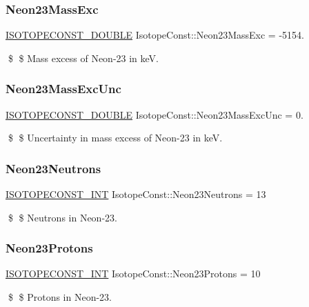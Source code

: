 \subsubsection{\texorpdfstring{Neon23\+Mass\+Exc}{Neon23MassExc}}
{\footnotesize\ttfamily \mbox{\hyperlink{group___isotope_const-_macros_ga8f45a7272ce02c0b4c65c44636ed719a}{I\+S\+O\+T\+O\+P\+E\+C\+O\+N\+S\+T\+\_\+\+D\+O\+U\+B\+LE}} Isotope\+Const\+::\+Neon23\+Mass\+Exc = -\/5154.}

\$ \$ Mass excess of Neon-\/23 in keV. \mbox{\label{group___isotope_const-_neon-_ne23_ga266e22a6d297330d9c5ab2d5cd67c79d}} 
\subsubsection{\texorpdfstring{Neon23\+Mass\+Exc\+Unc}{Neon23MassExcUnc}}
{\footnotesize\ttfamily \mbox{\hyperlink{group___isotope_const-_macros_ga8f45a7272ce02c0b4c65c44636ed719a}{I\+S\+O\+T\+O\+P\+E\+C\+O\+N\+S\+T\+\_\+\+D\+O\+U\+B\+LE}} Isotope\+Const\+::\+Neon23\+Mass\+Exc\+Unc = 0.}

\$ \$ Uncertainty in mass excess of Neon-\/23 in keV. \mbox{\label{group___isotope_const-_neon-_ne23_gad3a426a30ee41c4b3f859c8c8966a3b5}} 
\subsubsection{\texorpdfstring{Neon23\+Neutrons}{Neon23Neutrons}}
{\footnotesize\ttfamily \mbox{\hyperlink{group___isotope_const-_macros_ga5f18360b3e99483a35c32d789e62621c}{I\+S\+O\+T\+O\+P\+E\+C\+O\+N\+S\+T\+\_\+\+I\+NT}} Isotope\+Const\+::\+Neon23\+Neutrons = 13}

\$ \$ Neutrons in Neon-\/23. \mbox{\label{group___isotope_const-_neon-_ne23_ga6f8b3da7b653e18292eed55ba111965c}} 
\subsubsection{\texorpdfstring{Neon23\+Protons}{Neon23Protons}}
{\footnotesize\ttfamily \mbox{\hyperlink{group___isotope_const-_macros_ga5f18360b3e99483a35c32d789e62621c}{I\+S\+O\+T\+O\+P\+E\+C\+O\+N\+S\+T\+\_\+\+I\+NT}} Isotope\+Const\+::\+Neon23\+Protons = 10}

\$ \$ Protons in Neon-\/23. 